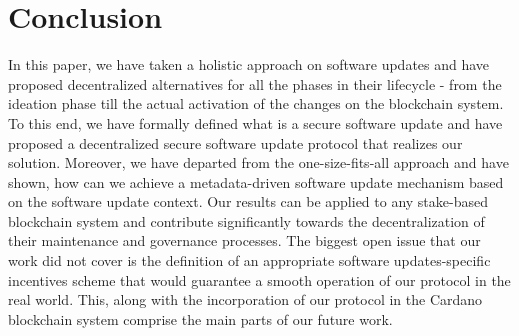 \section{Conclusion}
In this paper, we have taken a holistic approach on software updates and have proposed decentralized alternatives for all the phases in their lifecycle - from the ideation phase till the actual activation of the changes on the blockchain system. To this end, we have formally defined what is a secure software update and have proposed a decentralized secure software update protocol that realizes our solution. Moreover, we have departed from the one-size-fits-all approach and have shown, how can we achieve a metadata-driven software update mechanism based on the software update context. Our results can be applied to any stake-based blockchain system and contribute significantly towards the decentralization of their maintenance and governance processes. The biggest open issue that our work did not cover is the definition of an appropriate software updates-specific incentives scheme that would guarantee a smooth operation of our protocol in the real world. This, along with the incorporation of our protocol in the Cardano blockchain system \cite{cardano} comprise the main parts of our future work.